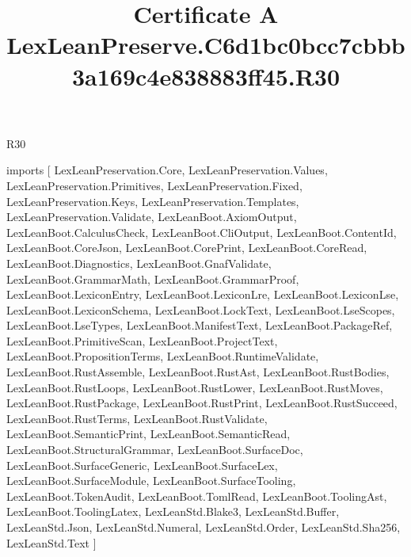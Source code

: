 \begin{lexlean}{R30}
\title{Certificate A LexLeanPreserve.C6d1bc0bcc7cbbb3a169c4e838883ff45.R30}
\begin{coremodule}
imports [
  LexLeanPreservation.Core,
  LexLeanPreservation.Values,
  LexLeanPreservation.Primitives,
  LexLeanPreservation.Fixed,
  LexLeanPreservation.Keys,
  LexLeanPreservation.Templates,
  LexLeanPreservation.Validate,
  LexLeanBoot.AxiomOutput,
  LexLeanBoot.CalculusCheck,
  LexLeanBoot.CliOutput,
  LexLeanBoot.ContentId,
  LexLeanBoot.CoreJson,
  LexLeanBoot.CorePrint,
  LexLeanBoot.CoreRead,
  LexLeanBoot.Diagnostics,
  LexLeanBoot.GnafValidate,
  LexLeanBoot.GrammarMath,
  LexLeanBoot.GrammarProof,
  LexLeanBoot.LexiconEntry,
  LexLeanBoot.LexiconLre,
  LexLeanBoot.LexiconLse,
  LexLeanBoot.LexiconSchema,
  LexLeanBoot.LockText,
  LexLeanBoot.LseScopes,
  LexLeanBoot.LseTypes,
  LexLeanBoot.ManifestText,
  LexLeanBoot.PackageRef,
  LexLeanBoot.PrimitiveScan,
  LexLeanBoot.ProjectText,
  LexLeanBoot.PropositionTerms,
  LexLeanBoot.RuntimeValidate,
  LexLeanBoot.RustAssemble,
  LexLeanBoot.RustAst,
  LexLeanBoot.RustBodies,
  LexLeanBoot.RustLoops,
  LexLeanBoot.RustLower,
  LexLeanBoot.RustMoves,
  LexLeanBoot.RustPackage,
  LexLeanBoot.RustPrint,
  LexLeanBoot.RustSucceed,
  LexLeanBoot.RustTerms,
  LexLeanBoot.RustValidate,
  LexLeanBoot.SemanticPrint,
  LexLeanBoot.SemanticRead,
  LexLeanBoot.StructuralGrammar,
  LexLeanBoot.SurfaceDoc,
  LexLeanBoot.SurfaceGeneric,
  LexLeanBoot.SurfaceLex,
  LexLeanBoot.SurfaceModule,
  LexLeanBoot.SurfaceTooling,
  LexLeanBoot.TokenAudit,
  LexLeanBoot.TomlRead,
  LexLeanBoot.ToolingAst,
  LexLeanBoot.ToolingLatex,
  LexLeanStd.Blake3,
  LexLeanStd.Buffer,
  LexLeanStd.Json,
  LexLeanStd.Numeral,
  LexLeanStd.Order,
  LexLeanStd.Sha256,
  LexLeanStd.Text
]


\end{coremodule}
\end{lexlean}
